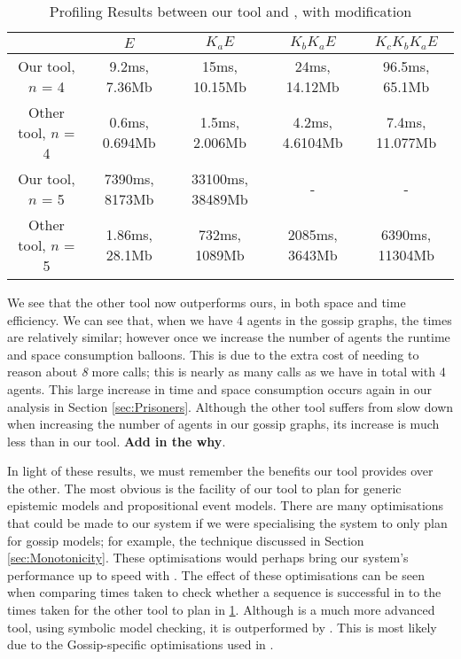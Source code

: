 \documentclass[10pt, a4paper]{report}
\begin{document}
\begin{table}[h]
  \centering
  \begin{tabular}{|c||c|c|c|c|}
    \hline
    & $E$ & $ K_a E$ & $K_b K_a E$ & $K_c K_b K_a E$ \\ \hline 
    Our tool, $n$ = 4 & 9.2ms, 7.36Mb & 15ms, 10.15Mb & 24ms, 14.12Mb & 96.5ms, 65.1Mb \\ \hline
    Other tool, $n$ = 4 & 0.6ms, 0.694Mb & 1.5ms, 2.006Mb & 4.2ms, 4.6104Mb & 7.4ms, 11.077Mb \\ \hline \hline
    Our tool, $n$ = 5 & 7390ms, 8173Mb & 33100ms, 38489Mb & - & - \\ \hline
    Other tool, $n$ = 5 & 1.86ms, 28.1Mb & 732ms, 1089Mb & 2085ms, 3643Mb & 6390ms, 11304Mb \\
    \hline
  \end{tabular}
  \caption{Profiling Results between our tool and \cite{GithubGossip}, with modification}
  \label{tab:Proflining2}
\end{table}

We see that the other tool now outperforms ours, in both space and time
efficiency. We can see that, when we have 4 agents in the gossip graphs, the
times are relatively similar; however once we increase the number of agents the
runtime and space consumption balloons. This is due to the extra cost of needing
to reason about \emph{8} more calls; this is nearly as many calls as we have
in total with 4 agents. This large increase in time and space consumption occurs
again in our analysis in Section \ref{sec:Prisoners}. Although the other tool
suffers from slow down when increasing the number of agents in our gossip
graphs, its increase is much less than in our tool. \textbf{Add in the why}.

In light of these results, we must remember the benefits our tool provides over
the other. The most obvious is the facility of our tool to plan for generic
epistemic models and propositional event models. There are many optimisations
that could be made to our system if we were specialising the system to only plan
for gossip models; for example, the technique discussed in Section
\ref{sec:Monotonicity}. These optimisations would perhaps bring our system's
performance up to speed with \cite{GithubGossip}. The effect of these
optimisations can be seen when comparing times taken to check whether a sequence
is successful in \cite{SMCDEL} to the times taken for the other tool to plan in
\ref{tab:Proflining2}. Although \cite{SMCDEL} is a much more advanced tool,
using symbolic model checking, it is outperformed by \cite{GithubGossip}. This
is most likely due to the Gossip-specific optimisations used in \cite{GithubGossip}.
\end{document}
